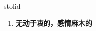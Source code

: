 
\begin{frame}
{\huge stolid}
\begin{center}
\begin{enumerate}\Large
  \item \textbf{无动于衷的，感情麻木的}
\end{enumerate}
\end{center}
\end{frame}
